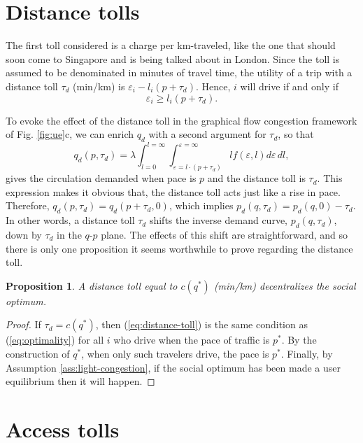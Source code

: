 \documentclass[preprint,authoryear]{elsarticle}
\newcommand{\taud}{\tau_d}
\newcommand{\ve}{\varepsilon}
\newtheorem{proposition}{Proposition}
\begin{document}
\section{Distance tolls}
\label{sec:distance_tolls}

The first toll considered is a charge per km-traveled, like the one that should soon come to Singapore and is being talked about in London. Since the toll is assumed to be denominated in minutes of travel time, the utility of a trip with a distance toll $\taud$ (min/km) is $\ve_i - l_i(p + \taud)$. Hence, $i$ will drive if and only if
\begin{equation}\label{eq:distance-toll}
	\ve_i \geq l_i (p+\taud).
\end{equation}

To evoke the effect of the distance toll in the graphical flow congestion framework of Fig. \ref{fig:ue}c, we can enrich $q_d$ with a second argument for $\taud$, so that
\begin{equation}
    q_d(p,\taud) = \lambda \int_{l=0}^{l=\infty}  \int_{\ve=l\cdot(p+\taud)}^{\ve=\infty} l f(\varepsilon,l)d\varepsilon \,  dl,
\end{equation}
gives the circulation demanded when pace is $p$ and the distance toll is $\taud$. This expression makes it obvious that, the distance toll acts just like a rise in pace. Therefore, $q_d(p,\taud)=q_d(p+\taud,0)$, which implies $p_d(q,\taud)=p_d(q,0)-\taud$. In other words, a distance toll $\taud$ shifts the inverse demand curve, $p_d(q,\taud)$, down by $\taud$ in the $q$-$p$ plane. The effects of this shift are straightforward, and so there is only one proposition it seems worthwhile to prove regarding the distance toll.

\begin{proposition}
A distance toll equal to $c(q^*)$ (min/km) decentralizes the social optimum.
\end{proposition}
\begin{proof}
If $\taud=c(q^*)$, then (\ref{eq:distance-toll}) is the same condition as (\ref{eq:optimality}) for all $i$ who drive when the pace of traffic is $p^*$. By the construction of $q^*$, when only such travelers drive, the pace is $p^*$. Finally, by Assumption \ref{ass:light-congestion}, if the social optimum has been made a user equilibrium then it will happen.
\end{proof}

\section{Access tolls}
\label{sec:access_tolls}
\end{document}
